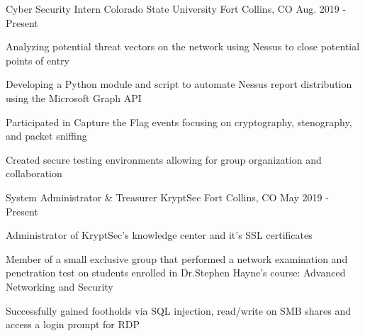 \vspace{-5.0mm}


\begin{cventries}

  \cventry
    {Cyber Security Intern} %
    {Colorado State University} %
    {Fort Collins, CO} %
    {Aug. 2019 - Present} %
    {
      \begin{cvitems} %
        \item {Analyzing potential threat vectors on the network using Nessus to close potential points of entry}
        \item {Developing a Python module and script to automate Nessus report distribution using the Microsoft Graph API}
        \item {Participated in Capture the Flag events focusing on cryptography, stenography, and packet sniffing}
        \item {Created secure testing environments allowing for group organization and collaboration}
      \end{cvitems}
    }

  \cventry
    {System Administrator \& Treasurer} %
    {KryptSec} %
    {Fort Collins, CO} %
    {May 2019 - Present} %
    {
      \begin{cvitems} %
        \item {Administrator of KryptSec’s knowledge center and it’s SSL certificates}
        \item {Member of a small exclusive group that performed a network examination and penetration test on students enrolled in Dr.Stephen Hayne’s course: Advanced Networking and Security}
        \item {Successfully gained footholds via SQL injection, read/write on SMB shares and access a login prompt for RDP}
      \end{cvitems}
    }


\end{cventries}
